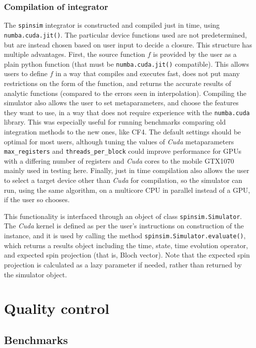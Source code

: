 \documentclass{jors}
\begin{document}
		\subsubsection*{Compilation of integrator}
			The \texttt{spinsim} integrator is constructed and compiled just in time, using \texttt{numba.cuda.jit()}. The particular device functions used are not predetermined, but are instead chosen based on user input to decide a closure. This structure has multiple advantages. First, the source function \(f\) is provided by the user as a plain python function (that must be \texttt{numba.cuda.jit()} compatible). This allows users to define \(f\) in a way that compiles and executes fast, does not put many restrictions on the form of the function, and returns the accurate results of analytic functions (compared to the errors seen in interpolation). Compiling the simulator also allows the user to set metaparameters, and choose the features they want to use, in a way that does not require experience with the \texttt{numba.cuda} library. This was especially useful for running benchmarks comparing old integration methods to the new ones, like CF4. The default settings should be optimal for most users, although tuning the values of \emph{Cuda} metaparameters \texttt{max\_registers} and \texttt{threads\_per\_block} could improve performance for GPUs with a differing number of registers and \emph{Cuda} cores to the mobile GTX1070 mainly used in testing here. Finally, just in time compilation also allows the user to select a target device other than \emph{Cuda} for compilation, so the simulator can run, using the same algorithm, on a multicore CPU in parallel instead of a GPU, if the user so chooses.
			
			This functionality is interfaced through an object of class \texttt{spinsim.Simulator}. The \emph{Cuda} kernel is defined as per the user’s instructions on construction of the instance, and it is used by calling the method \texttt{spinsim.Simulator.evaluate()}, which returns a results object including the time, state, time evolution operator, and expected spin projection (that is, Bloch vector). Note that the expected spin projection is calculated as a lazy parameter if needed, rather than returned by the simulator object.

\section*{Quality control}
	\subsection*{Benchmarks}
\end{document}
